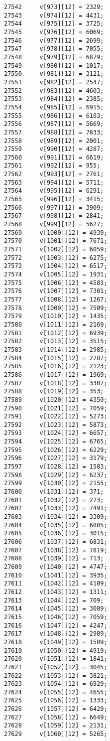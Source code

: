 \begin{Code}
\begin{verbatim}
27542     v[973][12] = 2329;
27543     v[974][12] = 4431;
27544     v[975][12] = 3725;
27545     v[976][12] = 6069;
27546     v[977][12] = 2699;
27547     v[978][12] = 7055;
27548     v[979][12] = 6879;
27549     v[980][12] = 1017;
27550     v[981][12] = 3121;
27551     v[982][12] = 2547;
27552     v[983][12] = 4603;
27553     v[984][12] = 2385;
27554     v[985][12] = 6915;
27555     v[986][12] = 6103;
27556     v[987][12] = 5669;
27557     v[988][12] = 7833;
27558     v[989][12] = 2001;
27559     v[990][12] = 4287;
27560     v[991][12] = 6619;
27561     v[992][12] = 955;
27562     v[993][12] = 2761;
27563     v[994][12] = 5711;
27564     v[995][12] = 6291;
27565     v[996][12] = 3415;
27566     v[997][12] = 3909;
27567     v[998][12] = 2841;
27568     v[999][12] = 5627;
27569     v[1000][12] = 4939;
27570     v[1001][12] = 7671;
27571     v[1002][12] = 6059;
27572     v[1003][12] = 6275;
27573     v[1004][12] = 6517;
27574     v[1005][12] = 1931;
27575     v[1006][12] = 4583;
27576     v[1007][12] = 7301;
27577     v[1008][12] = 1267;
27578     v[1009][12] = 7509;
27579     v[1010][12] = 1435;
27580     v[1011][12] = 2169;
27581     v[1012][12] = 6939;
27582     v[1013][12] = 3515;
27583     v[1014][12] = 2985;
27584     v[1015][12] = 2787;
27585     v[1016][12] = 2123;
27586     v[1017][12] = 1969;
27587     v[1018][12] = 3307;
27588     v[1019][12] = 353;
27589     v[1020][12] = 4359;
27590     v[1021][12] = 7059;
27591     v[1022][12] = 5273;
27592     v[1023][12] = 5873;
27593     v[1024][12] = 6657;
27594     v[1025][12] = 6765;
27595     v[1026][12] = 6229;
27596     v[1027][12] = 3179;
27597     v[1028][12] = 1583;
27598     v[1029][12] = 6237;
27599     v[1030][12] = 2155;
27600     v[1031][12] = 371;
27601     v[1032][12] = 273;
27602     v[1033][12] = 7491;
27603     v[1034][12] = 3309;
27604     v[1035][12] = 6805;
27605     v[1036][12] = 3015;
27606     v[1037][12] = 6831;
27607     v[1038][12] = 7819;
27608     v[1039][12] = 713;
27609     v[1040][12] = 4747;
27610     v[1041][12] = 3935;
27611     v[1042][12] = 4109;
27612     v[1043][12] = 1311;
27613     v[1044][12] = 709;
27614     v[1045][12] = 3089;
27615     v[1046][12] = 7059;
27616     v[1047][12] = 4247;
27617     v[1048][12] = 2989;
27618     v[1049][12] = 1509;
27619     v[1050][12] = 4919;
27620     v[1051][12] = 1841;
27621     v[1052][12] = 3045;
27622     v[1053][12] = 3821;
27623     v[1054][12] = 6929;
27624     v[1055][12] = 4655;
27625     v[1056][12] = 1333;
27626     v[1057][12] = 6429;
27627     v[1058][12] = 6649;
27628     v[1059][12] = 2131;
27629     v[1060][12] = 5265;

\end{verbatim}
\end{Code}
